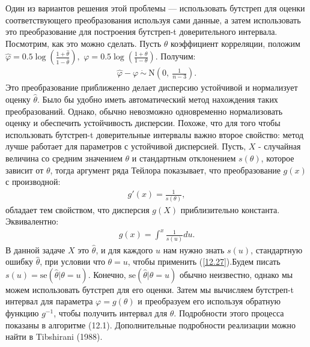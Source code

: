Один из вариантов решения этой проблемы --- использовать бутстреп для оценки соответствующего преобразования используя сами данные, а затем использовать это преобразование для построения бутстреп-t доверительного интервала. Посмотрим, как это можно сделать. Пусть $\theta$ коэффициент корреляции, положим $\widehat{\varphi} = 0.5 \log(\frac{1+\widehat{\theta}}{1 - \widehat{\theta}}),$ $\varphi = 0.5 \log(\frac{1+\theta}{1 - \theta})$. Получим:
\begin{gather}\label{12.25}
\hat{\varphi} - \varphi \  \dot{\sim} \  \mathrm{N}(0, \ \frac{1}{n - 3}).
\end{gather}
Это преобразование приближенно делает дисперсию устойчивой и нормализует оценку $\widehat{\theta}$. Было бы удобно иметь автоматический метод нахождения таких преобразований. Однако, обычно невозможно одновременно нормализовать оценку и обеспечить устойчивость дисперсии. Похоже, что для того чтобы использовать бутстреп-t доверительные интервалы важно второе свойство: метод лучше работает для параметров с устойчивой дисперсией. Пусть, $X$ - случайная величина со средним значением $\theta$ и стандартным отклонением $s(\theta)$, которое зависит от $\theta$, тогда аргумент ряда Тейлора показывает, что преобразование $g(x)$ с производной:
\begin{gather}\label{12.26}
g'(x) = \frac{1}{s(\theta)},
\end{gather}
обладает тем свойством, что дисперсия $g(X)$ приблизительно константа. Эквивалентно:
\begin{gather}\label{12.27}
g(x) = \int_{}^x \frac{1}{s(u)}du.
\end{gather}
В данной задаче $X$ это $\widehat{\theta}$, и для каждого $u$ нам нужно знать $s (u)$, стандартную ошибку $\widehat{\theta}$, при условии что $\theta = u$, чтобы применить (\ref{12.27}).Будем писать $s(u) = \text{se}(\widehat{\theta}|\theta = u)$. Конечно, $\text{se}(\widehat{\theta}|\theta = u)$ обычно неизвестно, однако мы можем использовать бутстреп для его оценки. Затем мы вычисляем бутстреп-t интервал для параметра $\varphi = g(\theta)$ и преобразуем его используя обратную функцию $g^{-1}$, чтобы получить интервал для $\theta$. Подробности этого процесса показаны в алгоритме (12.1). Дополнительные подробности реализации можно найти в Tibshirani (1988).


